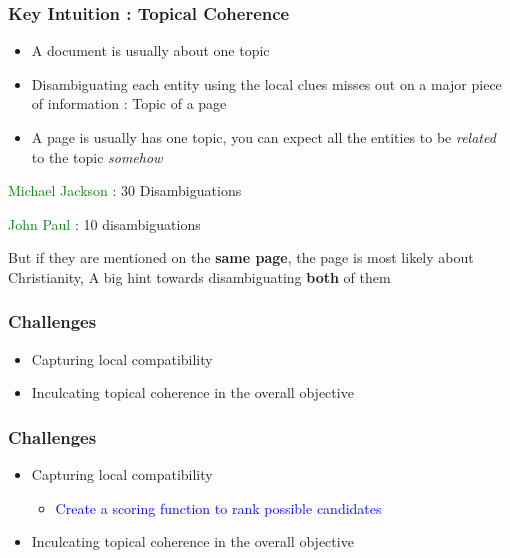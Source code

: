 \documentclass{beamer}
\begin{document}
\begin{frame}
 \frametitle{Key Intuition : Topical Coherence}
 \begin{itemize}
  \item A document is usually about one topic \bigskip
  \item Disambiguating each entity using the local clues misses out on a major piece of information : Topic of a page \bigskip
  \item A page is usually has one topic, you can expect all the entities to be \emph{related} to the topic \emph{somehow} \bigskip
  \end{itemize}
  \textcolor{green}{Michael Jackson} : 30 Disambiguations 
  
 \textcolor{green}{John Paul} : 10 disambiguations 
 
 
 
  But if they are mentioned on the \textbf{same page}, the page is most likely about Christianity, A big hint towards disambiguating \textbf{both} of them
  
 
  \end{frame}
 
\begin{frame}
 \frametitle{Challenges}
 \begin{itemize}
  \item Capturing local compatibility \bigskip
  \item Inculcating topical coherence in the overall objective \bigskip
 \end{itemize}

\end{frame}

\begin{frame}
 \frametitle{Challenges}
 \begin{itemize}
  \item Capturing local compatibility
  \begin{itemize}
   \item \textcolor{blue}{Create a scoring function to rank possible candidates}
  \end{itemize}

  \item Inculcating topical coherence in the overall objective
 \end{itemize}

\end{frame}
\end{document}
